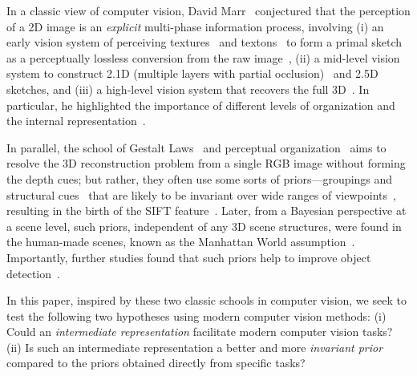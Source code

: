 \documentclass{article}
\begin{document}
In a classic view of computer vision, David Marr~\cite{marr1982vision} conjectured that the perception of a 2D image is an \emph{explicit} multi-phase information process, involving (i) an early vision system of perceiving textures~\cite{julesz1962visual,zhu1998filters} and textons~\cite{julesz1981textons,zhu2005textons} to form a primal sketch as a perceptually lossless conversion from the raw image~\cite{guo2003towards,guo2007primal}, (ii) a mid-level vision system to construct 2.1D (multiple layers with partial occlusion)~\cite{nitzberg19902,wang1993layered,wang1994representing} and 2.5D~\cite{marr1978representation} sketches, and (iii) a high-level vision system that recovers the full 3D~\cite{binford1971visual,brooks1981symbolic,kanade1981recovery}. In particular, he highlighted the importance of different levels of organization and the internal representation~\cite{broadbent1985question}.

In parallel, the school of Gestalt Laws~\citep{wertheimer1912experimentelle,wagemans2012century,wagemans2012century2,kohler1920physischen,kohler1938physical,wertheimer1923untersuchungen,wertheimer1938laws,koffka2013principles} and perceptual organization~\cite{lowe2012perceptual,pentland1987perceptual} aims to resolve the 3D reconstruction problem from a single RGB image without forming the depth cues; but rather, they often use some sorts of priors---groupings and structural cues~\cite{waltz1975understanding,barrow1981interpreting} that are likely to be invariant over wide ranges of viewpoints~\cite{lowe1987three}, resulting in the birth of the SIFT feature~\cite{lowe2004distinctive}. Later, from a Bayesian perspective at a scene level, such priors, independent of any 3D scene structures, were found in the human-made scenes, known as the Manhattan World assumption~\cite{coughlan2003manhattan}. Importantly, further studies found that such priors help to improve object detection~\cite{coughlan1999manhattan}.

In this paper, inspired by these two classic schools in computer vision, we seek to test the following two hypotheses using modern computer vision methods: (i) Could an \emph{intermediate representation} facilitate modern computer vision tasks? (ii) Is such an intermediate representation a better and more \emph{invariant prior} compared to the priors obtained directly from specific tasks?
\end{document}
